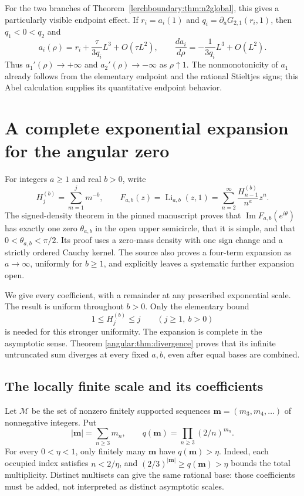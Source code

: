 \documentclass[11pt,a4paper]{article}
\theoremstyle{definition}
\theoremstyle{remark}
\numberwithin{equation}{section}
\DeclareMathOperator{\Li}{Li}
\DeclareMathOperator{\Imag}{Im}
\begin{document}
For the two branches of Theorem~\ref{lerchboundary:thm:n2global}, this
gives a particularly visible endpoint effect. If $r_i=a_i(1)$ and
$q_i=\partial_aG_{2,1}(r_i,1)$, then $q_1<0<q_2$ and
\[
 a_i(\rho)=r_i+\frac{\tau}{3q_i}L^3+O(\tau L^2),\qquad
 \frac{da_i}{d\rho}=-\frac{1}{3q_i}L^3+O(L^2).
\]
Thus $a_1'(\rho)\to+\infty$ and $a_2'(\rho)\to-\infty$ as
$\rho\uparrow1$.  The nonmonotonicity of $a_1$ already follows from
the elementary endpoint and the rational Stieltjes signs; this Abel
calculation supplies its quantitative endpoint behavior.
\section{A complete exponential expansion for the angular zero}
\label{angular:sec:main}

For integers $a\geq1$ and real $b>0$, write
\[
 H_j^{(b)}=\sum_{m=1}^j m^{-b},\qquad
 F_{a,b}(z)=\Li_{a,b}(z,1)
   =\sum_{n=2}^{\infty}\frac{H_{n-1}^{(b)}}{n^a}z^n.
\]
The signed-density theorem in the pinned manuscript
\cite[\texttt{signed:thm:unique-zero}]{ProveItSnapshot}
proves that $\Imag F_{a,b}(e^{i\theta})$ has exactly one zero
$\theta_{a,b}$ in the open upper semicircle, that it is simple, and
that $0<\theta_{a,b}<\pi/2$.  Its proof uses a zero-mass density
with one sign change and a strictly ordered Cauchy kernel.  The source
also proves a four-term expansion as $a\to\infty$, uniformly for
$b\geq1$, and explicitly leaves a systematic further expansion open.

We give every coefficient, with a remainder at any prescribed
exponential scale.  The result is uniform throughout $b>0$.  Only
the elementary bound
\begin{equation}\label{angular:eq:hbound}
 1\leq H_j^{(b)}\leq j\qquad(j\geq1,\ b>0)
\end{equation}
is needed for this stronger uniformity.  The expansion is complete in the asymptotic sense. Theorem
\ref{angular:thm:divergence} proves that its infinite untruncated sum
diverges at every fixed $a,b$, even after equal bases are combined.

\subsection{The locally finite scale and its coefficients}

Let $\mathscr M$ be the set of nonzero finitely supported sequences
$\mathbf m=(m_3,m_4,\ldots)$ of nonnegative integers. Put
\[
 |\mathbf m|=\sum_{n\geq3}m_n,
 \qquad q(\mathbf m)=\prod_{n\geq3}(2/n)^{m_n}.
\]
For every $0<\eta<1$, only finitely many $\mathbf m$ have
$q(\mathbf m)>\eta$. Indeed, each occupied index satisfies
$n<2/\eta$, and $(2/3)^{|\mathbf m|}\geq q(\mathbf m)>\eta$ bounds
the total multiplicity. Distinct multisets can give the same rational
base: those coefficients must be added, not interpreted as distinct
asymptotic scales.
\end{document}
